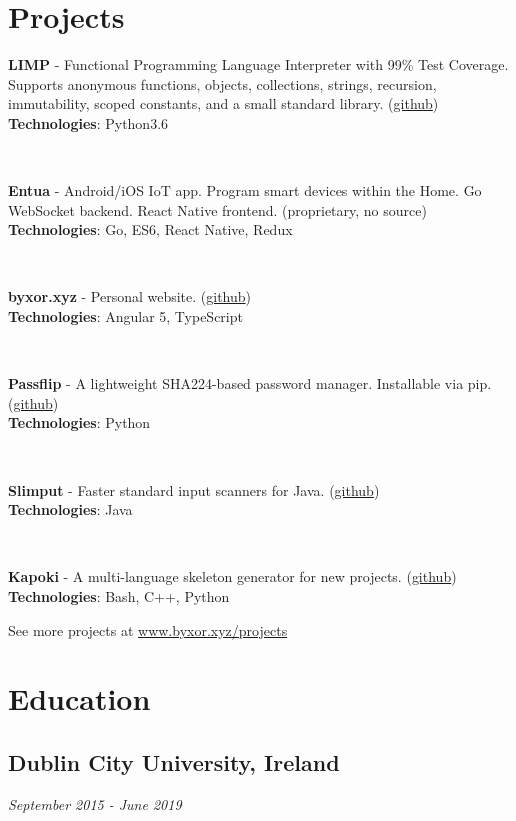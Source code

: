 \documentclass{article}
\begin{document}
\section{Projects}
\begin{multicols}{2}
\parbox{\linewidth}{\textbf{LIMP} - Functional Programming Language Interpreter with 99\% Test Coverage. Supports anonymous functions, objects, collections, strings, recursion, immutability, scoped constants, and a small standard library. (\href{http://www.github.com/byxor/limp}{github})\\
\textbf{Technologies}: Python3.6}\vspace{1em}\\\parbox{\linewidth}{\textbf{Entua} - Android/iOS IoT app. Program smart devices within the Home. Go WebSocket backend. React Native frontend. (proprietary, no source)\\
\textbf{Technologies}: Go, ES6, React Native, Redux}\vspace{1em}\\\parbox{\linewidth}{\textbf{byxor.xyz} - Personal website. (\href{http://www.github.com/byxor/website}{github})\\
\textbf{Technologies}: Angular 5, TypeScript}\vspace{1em}\\\parbox{\linewidth}{\textbf{Passflip} - A lightweight SHA224-based password manager. Installable via pip. (\href{http://www.github.com/byxor/passflip}{github})\\
\textbf{Technologies}: Python}\vspace{1em}\\\parbox{\linewidth}{\textbf{Slimput} - Faster standard input scanners for Java. (\href{http://www.github.com/byxor/slimput}{github})\\
\textbf{Technologies}: Java}\vspace{1em}\\\parbox{\linewidth}{\textbf{Kapoki} - A multi-language skeleton generator for new projects. (\href{http://www.github.com/byxor/kapoki}{github})\\
\textbf{Technologies}: Bash, C++, Python}
\end{multicols}
\begin{center}
 See more projects at \url{www.byxor.xyz/projects}
\end{center}
\section{Education}
\subsection{Dublin City University, Ireland}
\textit{September 2015 - June 2019}
\end{document}
